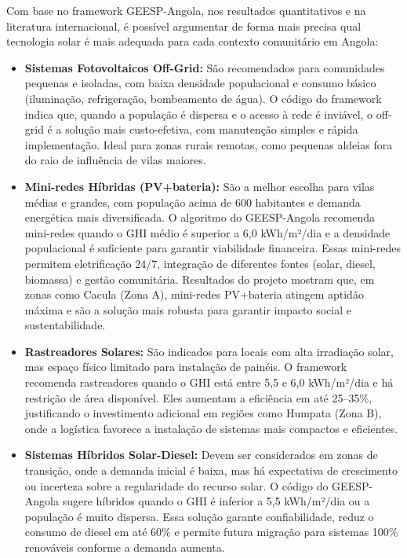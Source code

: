 \documentclass[12pt, a4paper]{article}
\begin{document}
Com base no framework GEESP-Angola, nos resultados quantitativos e na literatura internacional, é possível argumentar de forma mais precisa qual tecnologia solar é mais adequada para cada contexto comunitário em Angola:

\begin{itemize}
  \item \textbf{Sistemas Fotovoltaicos Off-Grid:} São recomendados para comunidades pequenas e isoladas, com baixa densidade populacional e consumo básico (iluminação, refrigeração, bombeamento de água). O código do framework indica que, quando a população é dispersa e o acesso à rede é inviável, o off-grid é a solução mais custo-efetiva, com manutenção simples e rápida implementação. Ideal para zonas rurais remotas, como pequenas aldeias fora do raio de influência de vilas maiores.

  \item \textbf{Mini-redes Híbridas (PV+bateria):} São a melhor escolha para vilas médias e grandes, com população acima de 600 habitantes e demanda energética mais diversificada. O algoritmo do GEESP-Angola recomenda mini-redes quando o GHI médio é superior a 6,0 kWh/m²/dia e a densidade populacional é suficiente para garantir viabilidade financeira. Essas mini-redes permitem eletrificação 24/7, integração de diferentes fontes (solar, diesel, biomassa) e gestão comunitária. Resultados do projeto mostram que, em zonas como Cacula (Zona A), mini-redes PV+bateria atingem aptidão máxima e são a solução mais robusta para garantir impacto social e sustentabilidade.

  \item \textbf{Rastreadores Solares:} São indicados para locais com alta irradiação solar, mas espaço físico limitado para instalação de painéis. O framework recomenda rastreadores quando o GHI está entre 5,5 e 6,0 kWh/m²/dia e há restrição de área disponível. Eles aumentam a eficiência em até 25--35\%, justificando o investimento adicional em regiões como Humpata (Zona B), onde a logística favorece a instalação de sistemas mais compactos e eficientes.

  \item \textbf{Sistemas Híbridos Solar-Diesel:} Devem ser considerados em zonas de transição, onde a demanda inicial é baixa, mas há expectativa de crescimento ou incerteza sobre a regularidade do recurso solar. O código do GEESP-Angola sugere híbridos quando o GHI é inferior a 5,5 kWh/m²/dia ou a população é muito dispersa. Essa solução garante confiabilidade, reduz o consumo de diesel em até 60\% e permite futura migração para sistemas 100\% renováveis conforme a demanda aumenta.


\end{itemize}
\end{document}
